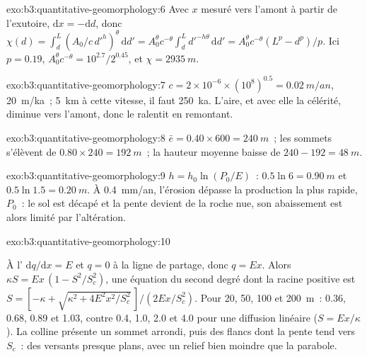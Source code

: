 \begin{solution}{exo:b3:quantitative-geomorphology:6}
Avec $x$ mesuré vers l'amont à partir de l'exutoire, $\mathrm{d}x = -\mathrm{d}d$, donc $\chi(d)
= \int_d^L (A_0/c\,d'^{h})^{\theta}\,\mathrm{d}d' = A_0^{\theta} c^{-\theta}
\int_d^L d'^{-h\theta}\,\mathrm{d}d' = A_0^{\theta}c^{-\theta}(L^p -
d^p)/p$. Ici $p = 0.19$, $A_0^{\theta}c^{-\theta} = 10^{2.7}/2^{0.45}$,
et $\chi = \qty{2935}{m}$.
\end{solution}

\begin{solution}{exo:b3:quantitative-geomorphology:7}
$c = 2\times10^{-6}\times(10^8)^{0.5} = \qty{0.02}{m/an}$, \qty{20}{m/ka}~;
\qty{5}{km} à cette vitesse, il faut \qty{250}{ka}. L'aire, et avec elle la
célérité, diminue vers l'amont, donc le  ralentit en remontant.
\end{solution}

\begin{solution}{exo:b3:quantitative-geomorphology:8}
$\bar e = 0.40\times600 = \qty{240}{m}$~; les sommets s'élèvent de $0.80\times240 =
\qty{192}{m}$~; la hauteur moyenne baisse de $240 - 192 = \qty{48}{m}$.
\end{solution}

\begin{solution}{exo:b3:quantitative-geomorphology:9}
$h = h_0\ln(P_0/E)$~: $0.5\ln 6 = \qty{0.90}{m}$ et $0.5\ln1.5 =
\qty{0.20}{m}$. À \qty{0.4}{mm/an}, l'érosion dépasse la production la plus rapide,
$P_0$~: le sol est décapé et la pente devient de la roche nue, son abaissement
est alors limité par l'altération.
\end{solution}

\begin{solution}{exo:b3:quantitative-geomorphology:10}
{\sloppy À l' $\mathrm{d}q/\mathrm{d}x = E$ et $q = 0$ à la ligne de partage, donc
$q = E x$. Alors $\kappa S = E x\,(1 - S^2/S_c^2)$, une équation du second degré dont la
racine positive est $S = [-\kappa + \sqrt{\kappa^2 + 4E^2x^2/S_c^2}\,]/(2Ex/S_c^2)$. Pour
20, 50, 100 et \qty{200}{m}~: 0.36, 0.68, 0.89 et 1.03, contre 0.4, 1.0,
2.0 et 4.0 pour une diffusion linéaire ($S = Ex/\kappa$). La colline présente un
sommet arrondi, puis des flancs dont la pente tend vers $S_c$~:
des versants presque plans, avec un relief bien moindre que la parabole.\par}
\end{solution}

